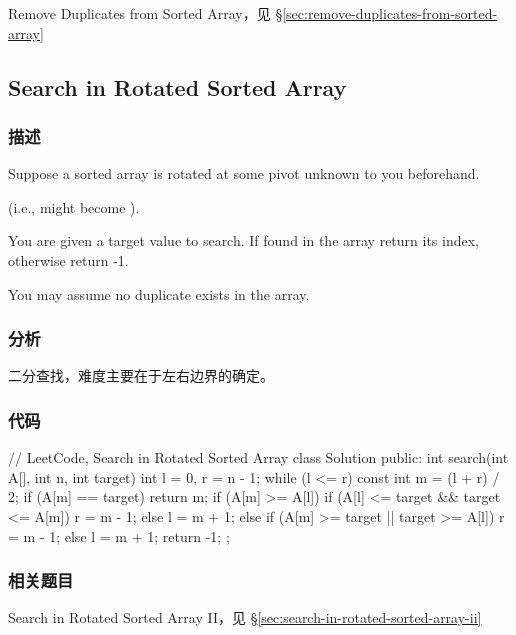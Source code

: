 \begindot
\item Remove Duplicates from Sorted Array，见 \S \ref{sec:remove-duplicates-from-sorted-array}
\myenddot


\subsection{Search in Rotated Sorted Array}
\label{sec:search-in-rotated-sorted-array}


\subsubsection{描述}
Suppose a sorted array is rotated at some pivot unknown to you beforehand.

(i.e.,  might become ).

You are given a target value to search. If found in the array return its index, otherwise return -1.

You may assume no duplicate exists in the array.


\subsubsection{分析}
二分查找，难度主要在于左右边界的确定。


\subsubsection{代码}
\begin{Code}
// LeetCode, Search in Rotated Sorted Array
class Solution {
public:
    int search(int A[], int n, int target) {
        int l = 0, r = n - 1;
        while (l <= r) {
            const int m = (l + r) / 2;
            if (A[m] == target)
                return m;
            if (A[m] >= A[l]) {
                if (A[l] <= target && target <= A[m])
                    r = m - 1;
                else
                    l = m + 1;
            } else {
                if (A[m] >= target || target >= A[l])
                    r = m - 1;
                else
                    l = m + 1;
            }
        }
        return -1;
    }
};
\end{Code}


\subsubsection{相关题目}

\begindot
\item Search in Rotated Sorted Array II，见 \S \ref{sec:search-in-rotated-sorted-array-ii}
\myenddot


